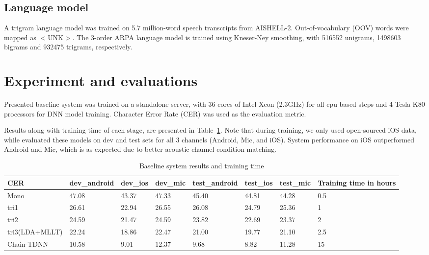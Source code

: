\documentclass[a4paper]{article}
\begin{document}
\subsection{Language model}

A trigram language model was trained on 5.7 million-word speech transcripts from AISHELL-2. Out-of-vocabulary (OOV) words were mapped as $<$UNK$>$. The 3-order ARPA language model is trained using Kneser-Ney smoothing, with 516552 unigrams, 1498603 bigrams and 932475 trigrams, respectively.

\section{Experiment and evaluations}

Presented baseline system was trained on a standalone server, with 36 cores of Intel Xeon (2.3GHz) for all cpu-based steps and 4
Tesla K80 processors for DNN model training. Character Error Rate (CER) was used as the evaluation metric. 

Results along with training time of each stage, are presented in Table~\ref{tab:base}. 
Note that during training, we only used open-sourced iOS data, while evaluated these models on dev and test sets for all 3 channels (Android, Mic, and iOS). System performance on iOS outperformed Android and Mic, which is as expected due to better acoustic channel condition matching.

\begin{table}[th]
  \caption{Baseline system results and training time}
  \label{tab:base}
  \centering
  \begin{tabular}{ llllllll }
    \toprule
    CER               &  dev\_android           &  dev\_ios           &  dev\_mic           & test\_android            &  test\_ios           &  test\_mic          &  Training time in hours         \\
    \midrule
    Mono        &  47.08                 &  43.37             &  47.33             &  45.40                  &  44.81              &  44.28             &  0.5                   \\
    tri1    &  26.61                 &  22.94             &  26.55             &  26.08                  &  24.79              &  25.36             &  1                     \\
    tri2    &  24.59                 &  21.47             &  24.59             &  23.82                 &  22.69              &  23.37             &  2                     \\
    tri3(LDA+MLLT)          &  22.24                 &  18.86             &  22.47             &  21.00                  &  19.77              &  21.10             &  2.5                   \\
    Chain-TDNN              &  10.58                 &  9.01             &  12.37         &  9.68                  &  8.82             &  11.28              &  15                    \\
    \bottomrule
  \end{tabular}
\end{table}
\end{document}
